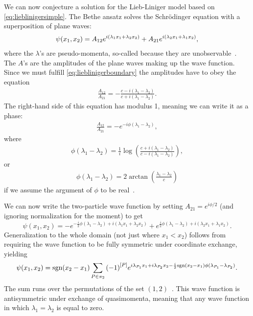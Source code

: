 \documentclass[11pt, a4paper]{report} %
\begin{document}
We can now conjecture a solution for the Lieb-Liniger model based on \cref{eq:lieblinigersimple}.
The Bethe ansatz solves the Schrödinger equation with a superposition of plane waves:
\begin{equation}
	\psi(x_1,x_2) = A_{12} e^{i\qty(\lambda_1x_1 + \lambda_2 x_2)} + A_{21} e^{i(\lambda_2 x_1 + \lambda_1 x_2)},
\end{equation}
where the \(\lambda\)'s are pseudo-momenta, so-called because they are unobservable~\cite{Franchini2017}.
The \(A\)'s are the amplitudes of the plane waves making up the wave function.
Since we must fulfill \cref{eq:lieblinigerboundary} the amplitudes have to obey the equation
\begin{align}
	\frac{A_{12}}{A_{21}} = -\frac{c-i(\lambda_1 - \lambda_2) }{c+i(\lambda_1 - \lambda_2)}.
\end{align}
The right-hand side of this equation has modulus 1, meaning we can write it as a phase:
\begin{align}
	\frac{A_{12}}{A_{21}} = -e^{-i\phi(\lambda_1-\lambda_2)},
\end{align}
where~\cite{Korepin1993}
\begin{align}
  \phi(\lambda_1-\lambda_2) = \frac{1}{i} \log(\frac{c+i(\lambda_1-\lambda_2)}{c-i(\lambda_1-\lambda_2)}),
\end{align}
or
\begin{align}
	\phi(\lambda_1-\lambda_2) = 2\arctan\left(\frac{\lambda_1-\lambda_2}{c}\right)
\end{align}
if we assume the argument of \(\phi\) to be real~\cite{Panfil2014}.

We can now write the two-particle wave function by setting \(A_{21}=e^{i\phi/2}\) (and ignoring normalization for the moment) to get
\begin{equation}
	\psi(x_1,x_2) = - e^{-\frac{i}{2}\phi(\lambda_1-\lambda_2)+i(\lambda_1x_1 + \lambda_2 x_2)} + e^{\frac{i}{2}\phi(\lambda_1-\lambda_2)+i(\lambda_2 x_1 + \lambda_1 x_2)}.
\end{equation}
Generalization to the whole domain (not just where \(x_1 < x_2\)) follows from requiring the wave function to be fully symmetric under coordinate exchange, yielding
\begin{equation}
  \psi\qty(x_1,x_2) = \textrm{sgn}(x_2-x_1)\sum_{P\in\pi_2} {(-1)}^{[P]} e^{i\lambda_{P_1}x_1 + i \lambda_{P_2} x_2- \frac{i}{2} \textrm{sgn}(x_2-x_1)\phi(\lambda_{P_1}-\lambda_{P_2})}.
\end{equation}
The sum runs over the permutations of the set \((1,2)\)~\cite{Caux2015}.
This wave function is antisymmetric under exchange of quasimomenta, meaning that any wave function in which \(\lambda_1=\lambda_2\) is equal to zero.
\end{document}
